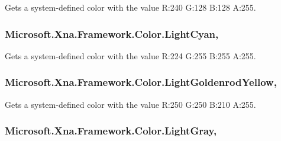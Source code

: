 Gets a system-\/defined color with the value R\+:240 G\+:128 B\+:128 A\+:255.

\hypertarget{struct_microsoft_1_1_xna_1_1_framework_1_1_color_aa6016c56f1299f4a5287f0738c816e75}{}
\subsubsection[{Light\+Cyan}]{ Microsoft.\+Xna.\+Framework.\+Color.\+Light\+Cyan\hspace{0.3cm}{\ttfamily [static]}, {\ttfamily [get]}}\label{struct_microsoft_1_1_xna_1_1_framework_1_1_color_aa6016c56f1299f4a5287f0738c816e75}


Gets a system-\/defined color with the value R\+:224 G\+:255 B\+:255 A\+:255.

\hypertarget{struct_microsoft_1_1_xna_1_1_framework_1_1_color_a90c16d976e97b0d3abe47073844af558}{}
\subsubsection[{Light\+Goldenrod\+Yellow}]{ Microsoft.\+Xna.\+Framework.\+Color.\+Light\+Goldenrod\+Yellow\hspace{0.3cm}{\ttfamily [static]}, {\ttfamily [get]}}\label{struct_microsoft_1_1_xna_1_1_framework_1_1_color_a90c16d976e97b0d3abe47073844af558}


Gets a system-\/defined color with the value R\+:250 G\+:250 B\+:210 A\+:255.

\hypertarget{struct_microsoft_1_1_xna_1_1_framework_1_1_color_aa5d88fef19c42987ad200af93a3cf587}{}
\subsubsection[{Light\+Gray}]{ Microsoft.\+Xna.\+Framework.\+Color.\+Light\+Gray\hspace{0.3cm}{\ttfamily [static]}, {\ttfamily [get]}}\label{struct_microsoft_1_1_xna_1_1_framework_1_1_color_aa5d88fef19c42987ad200af93a3cf587}


